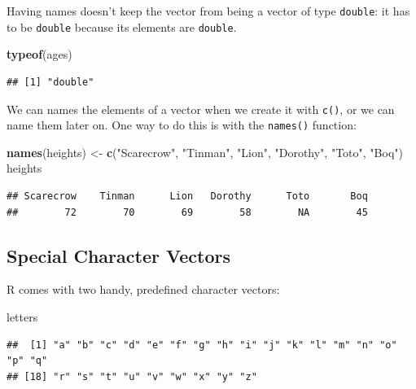 \documentclass[]{book}
\makeatletter
\newenvironment{Shaded}{\begin{snugshade}}{\end{snugshade}}
\newcommand{\KeywordTok}[1]{\textcolor[rgb]{0.13,0.29,0.53}{\textbf{{#1}}}}
\newcommand{\StringTok}[1]{\textcolor[rgb]{0.31,0.60,0.02}{{#1}}}
\newcommand{\NormalTok}[1]{{#1}}
\newenvironment{kframe}{%
\medskip{}
\setlength{\fboxsep}{.8em}
 \def\at@end@of@kframe{}%
 \ifinner\ifhmode%
  \def\at@end@of@kframe{\end{minipage}}%
  \begin{minipage}{\columnwidth}%
 \fi\fi%
 \def\FrameCommand##1{\hskip\@totalleftmargin \hskip-\fboxsep
 \colorbox{shadecolor}{##1}\hskip-\fboxsep
     \hskip-\linewidth \hskip-\@totalleftmargin \hskip\columnwidth}%
 \MakeFramed {\advance\hsize-\width
   \@totalleftmargin\z@ \linewidth\hsize
   \@setminipage}}%
 {\par\unskip\endMakeFramed%
 \at@end@of@kframe}
\renewenvironment{Shaded}{\begin{kframe}}{\end{kframe}}
\theoremstyle{definition}
\theoremstyle{definition}
\theoremstyle{remark}
\makeatother
\begin{document}
Having names doesn't keep the vector from being a vector of type
\texttt{double}: it has to be \texttt{double} because its elements are
\texttt{double}.

\begin{Shaded}
\begin{Highlighting}[]
\KeywordTok{typeof}\NormalTok{(ages)}
\end{Highlighting}
\end{Shaded}

\begin{verbatim}
## [1] "double"
\end{verbatim}

We can names the elements of a vector when we create it with
\texttt{c()}, or we can name them later on. One way to do this is with
the \texttt{names()}
function:

\begin{Shaded}
\begin{Highlighting}[]
\KeywordTok{names}\NormalTok{(heights) <-}\StringTok{ }\KeywordTok{c}\NormalTok{(}\StringTok{"Scarecrow"}\NormalTok{, }\StringTok{"Tinman"}\NormalTok{, }\StringTok{"Lion"}\NormalTok{, }\StringTok{"Dorothy"}\NormalTok{, }\StringTok{"Toto"}\NormalTok{, }\StringTok{"Boq"}\NormalTok{)}
\NormalTok{heights}
\end{Highlighting}
\end{Shaded}

\begin{verbatim}
## Scarecrow    Tinman      Lion   Dorothy      Toto       Boq 
##        72        70        69        58        NA        45
\end{verbatim}

\subsection{Special Character Vectors}\label{special-character-vectors}

R comes with two handy, predefined character vectors:

\begin{Shaded}
\begin{Highlighting}[]
\NormalTok{letters}
\end{Highlighting}
\end{Shaded}

\begin{verbatim}
##  [1] "a" "b" "c" "d" "e" "f" "g" "h" "i" "j" "k" "l" "m" "n" "o" "p" "q"
## [18] "r" "s" "t" "u" "v" "w" "x" "y" "z"
\end{verbatim}
\end{document}
